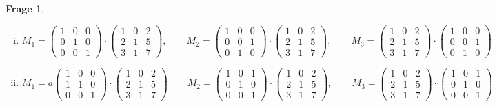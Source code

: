 \documentclass{scrartcl}
\theoremstyle{definition}
\newtheorem{frage}{Frage}
\begin{document}
\begin{frage}
\begin{enumerate}[(i)]
\item \[ M_1 =
\begin{pmatrix}
  1 & 0 & 0 \\
  0 & 1 & 0 \\
  0 & 0 & 1 
\end{pmatrix} \cdot \begin{pmatrix}
  1  & 0 & 2 \\
  2  & 1 & 5 \\
  3  & 1 & 7
\end{pmatrix}, \qquad M_2 =
\begin{pmatrix}
  1 & 0 & 0 \\
  0 & 0 & 1 \\
  0 & 1 & 0 
\end{pmatrix} \cdot \begin{pmatrix}
  1  & 0 & 2 \\
  2  & 1 & 5 \\
  3  & 1 & 7
\end{pmatrix}, \qquad M_3 =
\begin{pmatrix}
  1  & 0 & 2 \\
  2  & 1 & 5 \\
  3  & 1 & 7
\end{pmatrix} \cdot \begin{pmatrix}
  1 & 0 & 0 \\
  0 & 0 & 1 \\
  0 & 1 & 0 
\end{pmatrix}
\]
\item \[ M_1 =a
\begin{pmatrix}
  1 & 0 & 0 \\
  1 & 1 & 0 \\
  0 & 0 & 1 
\end{pmatrix} \cdot \begin{pmatrix}
  1  & 0 & 2 \\
  2  & 1 & 5 \\
  3  & 1 & 7
\end{pmatrix} \qquad M_2 =
\begin{pmatrix}
  1 & 0 & 1 \\
  0 & 1 & 0 \\
  0 & 0 & 1 
\end{pmatrix} \cdot \begin{pmatrix}
  1  & 0 & 2 \\
  2  & 1 & 5 \\
  3  & 1 & 7
\end{pmatrix}, \qquad M_3 =
\begin{pmatrix}
  1  & 0 & 2 \\
  2  & 1 & 5 \\
  3  & 1 & 7
\end{pmatrix} \cdot \begin{pmatrix}
  1 & 0 & 1 \\
  0 & 1 & 0 \\
  0 & 0 & 1 
\end{pmatrix}
\]
\end{enumerate}
\end{frage}
\end{document}
